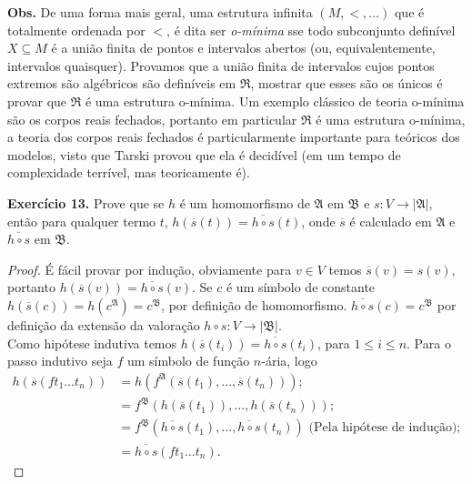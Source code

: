 \documentclass[11pt]{article}
\newcommand{\mf}[1]{\mathfrak{#1}}
\begin{document}
\begin{shaded}
\textbf{Obs.} De uma forma mais geral, uma estrutura infinita $(M,<,\dots)$ que é totalmente ordenada por $<$, é dita ser \textit{o-mínima} sse todo subconjunto definível $X\subseteq M$ é a união finita de pontos e intervalos abertos (ou, equivalentemente, intervalos quaisquer). Provamos que a união finita de intervalos cujos pontos extremos são algébricos são definíveis em $\mf{R}$, mostrar que esses são os únicos é provar que $\mf{R}$ é uma estrutura o-mínima. Um exemplo clássico de teoria o-mínima são os corpos reais fechados, portanto em particular $\mf{R}$ é uma estrutura o-mínima, a teoria dos corpos reais fechados é particularmente importante para teóricos dos modelos, visto que Tarski provou que ela é decidível (em um tempo de complexidade terrível, mas teoricamente é).
\end{shaded}

\begin{shaded}
\textbf{Exercício 13.} Prove que se $h$ é um homomorfismo de $\mf{A}$ em $\mf{B}$ e $s:V\to|\mf{A}|$, então para qualquer termo $t$, $h(\overline{s}(t))=\overline{h\circ s}(t)$, onde $\overline{s}$ é calculado em $\mf{A}$ e $\overline{h\circ s}$ em $\mf{B}$.
\end{shaded}

\begin{proof}
    É fácil provar por indução, obviamente para $v\in V$ temos $\overline{s}(v)=s(v)$, portanto $h(\overline{s}(v))=\overline{h\circ s}(v)$. Se $c$ é um símbolo de constante $h(\overline{s}(c))=h(c^\mf{A})=c^\mf{B}$, por definição de homomorfismo. $\overline{h\circ s}(c)=c^\mf{B}$ por definição da extensão da valoração $h\circ s:V\to|\mf{B}|$.\\
    Como hipótese indutiva temos $h(\overline{s}(t_i))=\overline{h\circ s}(t_i)$, para $1\leq i \leq n$. Para o passo indutivo seja $f$ um símbolo de função $n$-ária, logo
    \begin{align*}
        h(\overline{s}(ft_1\dots t_n)) & = h\left(f^\mf{A}\left(\overline{s}(t_1),\dots,\overline{s}(t_n)\right)\right);\\
        & = f^\mf{B}\left(h(\overline{s}(t_1)),\dots,h(\overline{s}(t_n))\right);\\
        & = f^\mf{B}\left(\overline{h\circ s}(t_1),\dots,\overline{h\circ s}(t_n)\right)\text{ (Pela hipótese de indução)};\\
        & = \overline{h\circ s}(ft_1\dots t_n).
    \end{align*}
\end{proof}
\end{document}

